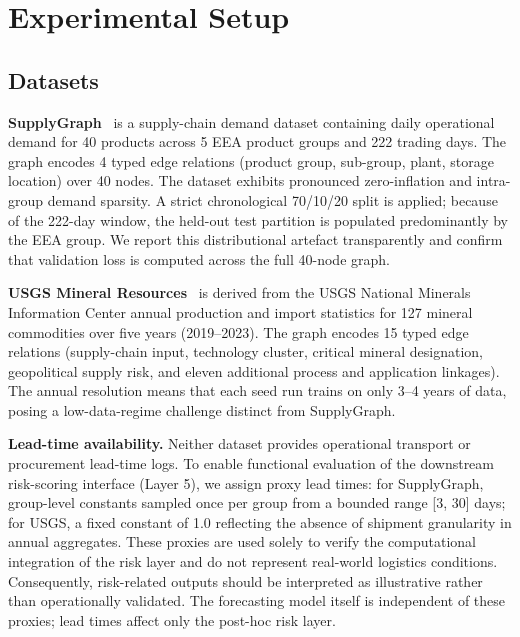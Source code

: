 
\section{Experimental Setup}
\label{sec:setup}

\subsection{Datasets}

\textbf{SupplyGraph}~\cite{wasi2024supplygraph} is a supply-chain
demand dataset containing daily operational demand for 40 products
across 5 EEA product groups and 222 trading days. The graph encodes
4 typed edge relations (product group, sub-group, plant, storage
location) over 40 nodes. The dataset exhibits pronounced
zero-inflation and intra-group demand sparsity. A strict
chronological 70/10/20 split is applied; because of the 222-day
window, the held-out test partition is populated predominantly by
the EEA group. We report this distributional artefact transparently
and confirm that validation loss is computed across the full 40-node
graph.

\textbf{USGS Mineral Resources}~\cite{usgs2023minerals} is derived
from the USGS National Minerals Information Center annual
production and import statistics for 127 mineral commodities over
five years (2019--2023). The graph encodes 15 typed edge relations
(supply-chain input, technology cluster, critical mineral
designation, geopolitical supply risk, and eleven additional
process and application linkages). The annual resolution means that
each seed run trains on only 3--4 years of data, posing a
low-data-regime challenge distinct from SupplyGraph.

\textbf{Lead-time availability.} Neither dataset provides operational transport or procurement lead-time logs. To enable functional evaluation of the downstream risk-scoring interface (Layer 5), we assign proxy lead times: for SupplyGraph, group-level constants sampled once per group from a bounded range [3, 30] days; for USGS, a fixed constant of 1.0 reflecting the absence of shipment granularity in annual aggregates. These proxies are used solely to verify the computational integration of the risk layer and do not represent real-world logistics conditions. Consequently, risk-related outputs should be interpreted as illustrative rather than operationally validated. The forecasting model itself is independent of these proxies; lead times affect only the post-hoc risk layer.

